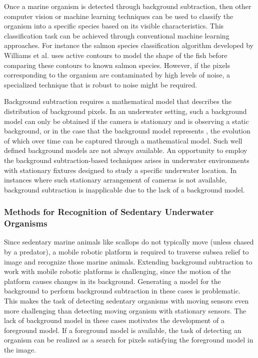 Once a marine organism is detected through background subtraction, then other computer vision or machine learning techniques can be used to classify the organism into a specific species based on its visible characteristics. This classification task can be achieved through conventional machine learning approaches. For instance the salmon species classification algorithm developed by Williams et al. \cite{williams} uses active contours to model the shape of the fish before comparing these contours to known salmon species. However, if the pixels corresponding to the organism are contaminated by high levels of noise, a specialized technique that is robust to noise might be required.

Background subtraction requires a mathematical model that describes the distribution of background pixels. In an underwater setting, such a background model can only be obtained if the camera is stationary and is observing a static background, or in the case that the background model represents , the evolution of which over time can be captured through a mathematical model. Such well defined background models are not always available. An opportunity to employ the background subtraction-based techniques arises in underwater environments with stationary fixtures designed to study a specific underwater location. In instances where such stationary arrangement of cameras is not available, background subtraction is inapplicable due to the lack of a background model.


\subsubsection{Methods for Recognition of Sedentary Underwater Organisms}

Since sedentary marine animals like scallops do not typically move (unless chased by a predator), a mobile robotic platform is required to traverse subsea relief to image and recognize those marine animals. Extending background subtraction to work with mobile robotic platforms is challenging, since the motion of the platform causes changes in its background. Generating a model for the background to perform background subtraction in these cases is problematic. This makes the task of detecting sedentary organisms with moving sensors even more challenging than detecting moving organism with stationary sensors. The lack of background model in these cases motivates the development of a foreground model. If a foreground model is available, the task of detecting an organism can be realized as a search for pixels satisfying the foreground model in the image.

